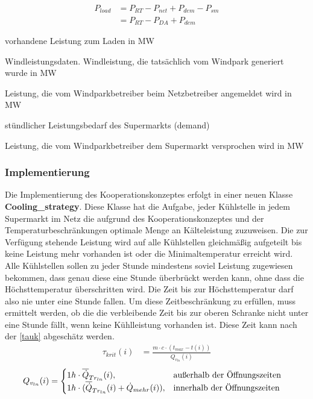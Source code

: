 \begin{align}
	P_{load} &= P_{RT} - P_{net} + P_{dem} - P_{sm}\\
		&= P_{RT} - P_{DA} + P_{dem}
	\label{pload}
\end{align}
\begin{description}[\dth]
	\item[$P_{load}$] vorhandene Leistung zum Laden in MW
	\item[$P_{RT}$] Windleistungsdaten. Windleistung, die tats\"achlich vom
	Windpark generiert wurde in MW
	\item[$P_{net}$] Leistung, die vom Windparkbetreiber beim Netzbetreiber
	angemeldet wird in MW
	\item[$P_{dem}$] st\"undlicher Leistungsbedarf des Supermarkts (demand)
	\item[$P_{sm}$] Leistung, die vom Windparkbetreiber dem Supermarkt
	versprochen wird in MW
\end{description} \vspace{0.5cm}

\subsubsection*{Implementierung}
Die Implementierung des Kooperationskonzeptes erfolgt in einer neuen Klasse
\textbf{Cooling\_strategy}. Diese Klasse hat die Aufgabe, jeder K\"uhlstelle in
jedem Supermarkt im Netz die aufgrund des Kooperationskonzeptes und der
Temperaturbeschr\"ankungen optimale Menge an K\"alteleistung zuzuweisen. Die zur
Verf\"ugung stehende Leistung wird auf alle K\"uhlstellen gleichm\"a\ss ig
aufgeteilt bis keine Leistung mehr vorhanden ist oder die Minimaltemperatur
erreicht wird. Alle K\"uhlstellen sollen zu jeder Stunde mindestens soviel
Leistung zugewiesen bekommen, dass genau diese eine Stunde \"uberbr\"uckt werden
kann, ohne dass die H\"ochsttemperatur \"uberschritten wird. Die Zeit bis zur
H\"ochsttemperatur darf also nie unter eine Stunde fallen. Um diese
Zeitbeschr\"ankung zu erf\"ullen, muss ermittelt werden, ob die die verbleibende
Zeit bis zur oberen Schranke nicht unter eine Stunde f\"allt, wenn keine
K\"uhlleistung vorhanden ist.
Diese Zeit kann nach der \cref{tauk} abgesch\"atz werden.
\begin{align}
	\tau_{krit}(i) &= \frac{m \cdot c \cdot (t_{max} -
		t(i))}{Q_{v_{ln}}(i)}
\label{tauk}
\end{align}
\begin{align*}
	Q_{v_{ln}}(i) &= \begin{cases}
	1h \cdot \overline{\dot{Q}}_{Tr_{ln}}(i), & \text{au\ss erhalb der \"Offnungszeiten}\\
	1h \cdot (\overline{\dot{Q}}_{Tr_{ln}}(i) + \dot{Q}_{mehr}(i)), & \text{innerhalb der
	\"Offnungszeiten} \end{cases}
\end{align*}

